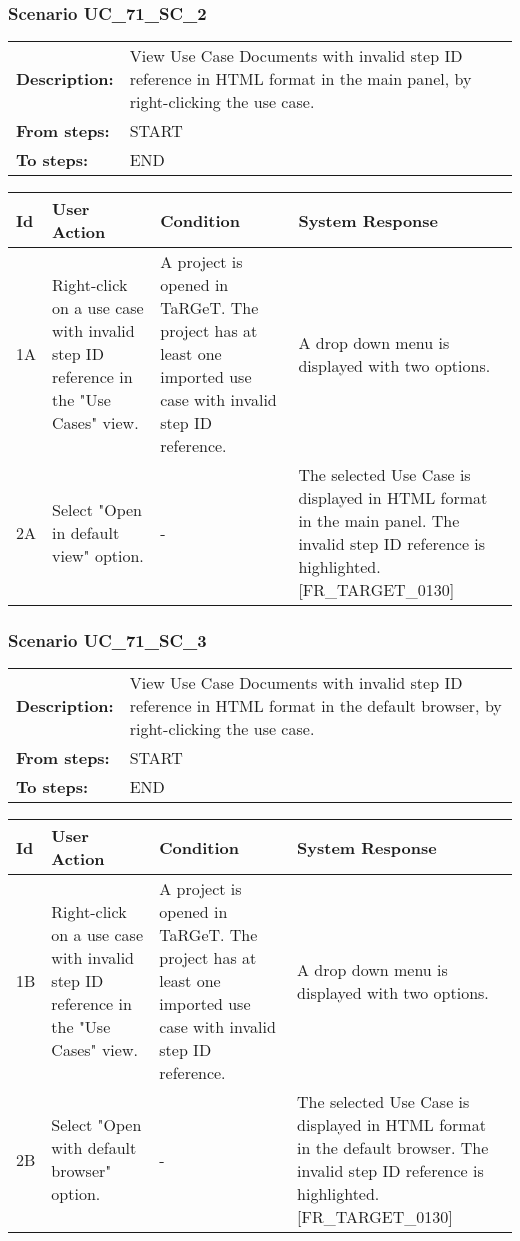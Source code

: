\documentclass[a4paper,11pt]{article}
\newcommand{\bl}{\\ \hline}
\begin{document}
\subsubsection*{Scenario UC_71_SC_2}
\begin{tabular}{p{1in}p{4in}}
{\bf Description:} & View Use Case Documents with invalid step ID reference in HTML format in the main panel, by right-clicking the use case. \\
{\bf From steps:} & START \\
{\bf To steps:} & END \\
\end{tabular}
 
\begin{tabular}{|p{0.8in}|p{1.6in}|p{1.6in}|p{1.6in}|}
\hline
Id & User Action & Condition & System Response  \bl 
1A & Right-click on a use case with invalid step ID reference in the "Use Cases" view. & A project is opened in TaRGeT. The project has at least one imported use case with invalid step ID reference. & A drop down menu is displayed with two options. \bl 
2A & Select "Open in default view" option. & - & The selected Use Case is displayed in HTML format in the main panel. The invalid step ID reference is highlighted. [FR_TARGET_0130] \bl 
\end{tabular}
\subsubsection*{Scenario UC_71_SC_3}
\begin{tabular}{p{1in}p{4in}}
{\bf Description:} & View Use Case Documents with invalid step ID reference in HTML format in the default browser, by right-clicking the use case. \\
{\bf From steps:} & START \\
{\bf To steps:} & END \\
\end{tabular}
 
\begin{tabular}{|p{0.8in}|p{1.6in}|p{1.6in}|p{1.6in}|}
\hline
Id & User Action & Condition & System Response  \bl 
1B & Right-click on a use case with invalid step ID reference in the "Use Cases" view. & A project is opened in TaRGeT. The project has at least one imported use case with invalid step ID reference. & A drop down menu is displayed with two options. \bl 
2B & Select "Open with default browser" option. & - & The selected Use Case is displayed in HTML format in the default browser. The invalid step ID reference is highlighted.  [FR_TARGET_0130] \bl 
\end{tabular}
\end{document}
